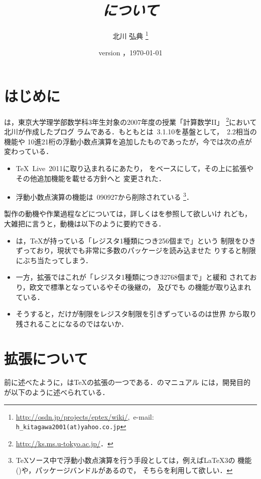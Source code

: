 \documentclass[a4paper,11pt,nomag]{jsarticle}
\begin{document}
\title{\emph{\epTeX について}}
\author{北川 弘典\null
\thanks{\url{http://osdn.jp/projects/eptex/wiki/},\ 
e-mail: \texttt{h\_kitagawa2001(at)yahoo.co.jp}}}
\date{version \the\epTeXversion，\today}
\maketitle
\tableofcontents

\newpage
\section{はじめに}
\epTeX は，東京大学理学部数学科3年生対象の2007年度の授業「計算数学II」
\footnote{\url{http://ks.ms.u-tokyo.ac.jp/}．}において北川が作成したプログ
ラムである．もともとは\pTeX~3.1.10を基盤として，\eTeX~2.2相当の機能や
10進21桁の浮動小数点演算を追加したものであったが，今では次の点が変わっている．
\begin{itemize}
  \item \TeX~Live~2011に取り込まれるにあたり，
  \eTeX をベースにして，その上に\pTeX 拡張やその他追加機能を載せる方針へと
  変更された．
  \item 浮動小数点演算の機能は\epTeX~090927から削除されている
  \footnote{%
  \TeX ソース中で浮動小数点演算を行う手段としては，例えば\LaTeX3の
  機能()や，パッケージバンドルがあるので，
  そちらを利用して欲しい．}．
\end{itemize}

製作の動機や作業過程などについては，詳しくは\cite{h7k}を参照して欲しいけ
れども，大雑把に言うと，動機は以下のように要約できる．
\begin{itemize}
\item \pTeX は，\TeX が持っている「レジスタ1種類につき256個まで」という
      制限をひきずっており，現状でも非常に多数のパッケージを読み込ませた
      りすると制限にぶち当たってしまう．
\item 一方，\eTeX 拡張ではこれが「レジスタ1種類につき32768個まで」と緩和
      されており，欧文で標準となっているやその後継の，
      及びでも
      \eTeX の機能が取り込まれている．
\item そうすると，\pTeX だけが制限をレジスタ制限を引きずっているのは世界
      から取り残されることになるのではないか．
\end{itemize}

\section{\eTeX 拡張について}
前に述べたように，\eTeX は\TeX の拡張の一つである．\eTeX のマニュアル
\cite{etexman}には，開発目的が以下のように述べられている．
\end{document}
